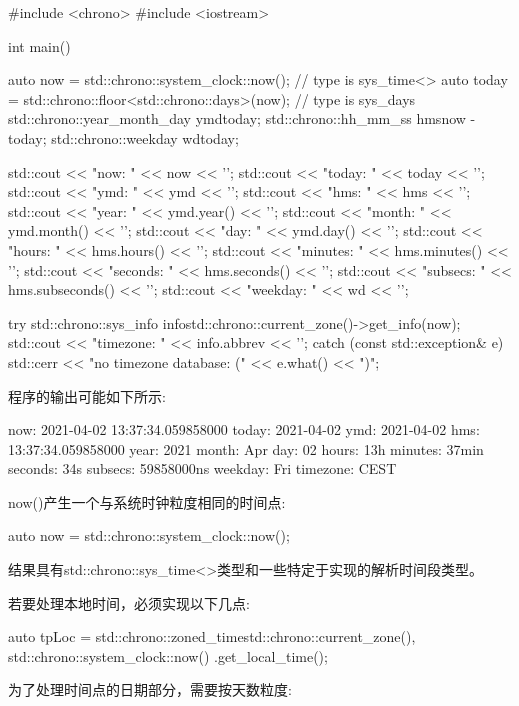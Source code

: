 \begin{cpp}
#include <chrono>
#include <iostream>

int main()
{
	auto now = std::chrono::system_clock::now(); // type is sys_time<>
	auto today = std::chrono::floor<std::chrono::days>(now); // type is sys_days
	std::chrono::year_month_day ymd{today};
	std::chrono::hh_mm_ss hms{now - today};
	std::chrono::weekday wd{today};

	std::cout << "now: " << now << '\n';
	std::cout << "today: " << today << '\n';
	std::cout << "ymd: " << ymd << '\n';
	std::cout << "hms: " << hms << '\n';
	std::cout << "year: " << ymd.year() << '\n';
	std::cout << "month: " << ymd.month() << '\n';
	std::cout << "day: " << ymd.day() << '\n';
	std::cout << "hours: " << hms.hours() << '\n';
	std::cout << "minutes: " << hms.minutes() << '\n';
	std::cout << "seconds: " << hms.seconds() << '\n';
	std::cout << "subsecs: " << hms.subseconds() << '\n';
	std::cout << "weekday: " << wd << '\n';

	try {
		std::chrono::sys_info info{std::chrono::current_zone()->get_info(now)};
		std::cout << "timezone: " << info.abbrev << '\n';
	}
	catch (const std::exception& e) {
		std::cerr << "no timezone database: (" << e.what() << ")\n";
	}
}
\end{cpp}

程序的输出可能如下所示:

\begin{shell}
now:      2021-04-02 13:37:34.059858000
today:    2021-04-02
ymd:      2021-04-02
hms:      13:37:34.059858000
year:     2021
month:    Apr
day:      02
hours:    13h
minutes:  37min
seconds:  34s
subsecs:  59858000ns
weekday:  Fri
timezone: CEST
\end{shell}

now()产生一个与系统时钟粒度相同的时间点:

\begin{cpp}
auto now = std::chrono::system_clock::now();
\end{cpp}

结果具有std::chrono::sys\_time<>类型和一些特定于实现的解析时间段类型。

若要处理本地时间，必须实现以下几点:

\begin{cpp}
auto tpLoc = std::chrono::zoned_time{std::chrono::current_zone(),
										std::chrono::system_clock::now()
									}.get_local_time();
\end{cpp}

为了处理时间点的日期部分，需要按天数粒度:

